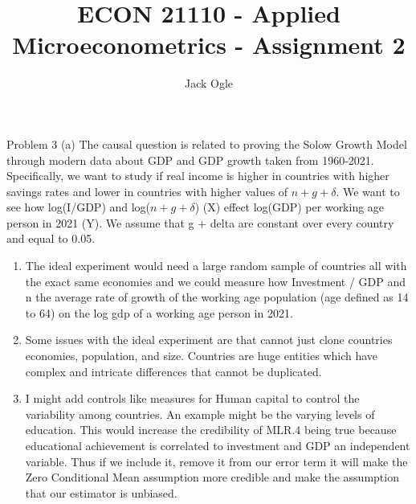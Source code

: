 \documentclass[
  12pt,
  landscape]{article}
\title{ECON 21110 - Applied Microeconometrics - Assignment 2}
\author{Jack Ogle}
\date{}
\begin{document}
\maketitle

Problem 3 (a) The causal question is related to proving the Solow Growth
Model through modern data about GDP and GDP growth taken from 1960-2021.
Specifically, we want to study if real income is higher in countries
with higher savings rates and lower in countries with higher values of
\({ n + g + \delta}\). We want to see how log(I/GDP) and
log(\({ n + g + \delta}\)) (X) effect log(GDP) per working age person in
2021 (Y). We assume that g + delta are constant over every country and
equal to 0.05.

\begin{enumerate}
\def\labelenumi{(\alph{enumi})}
\setcounter{enumi}{1}
\item
  The ideal experiment would need a large random sample of countries all
  with the exact same economies and we could measure how Investment /
  GDP and n the average rate of growth of the working age population
  (age defined as 14 to 64) on the log gdp of a working age person in
  2021.
\item
  Some issues with the ideal experiment are that cannot just clone
  countries economies, population, and size. Countries are huge entities
  which have complex and intricate differences that cannot be
  duplicated.
\item
  I might add controls like measures for Human capital to control the
  variability among countries. An example might be the varying levels of
  education. This would increase the credibility of MLR.4 being true
  because educational achievement is correlated to investment and GDP an
  independent variable. Thus if we include it, remove it from our error
  term it will make the Zero Conditional Mean assumption more credible
  and make the assumption that our estimator is unbiased.
\end{enumerate}
\end{document}
